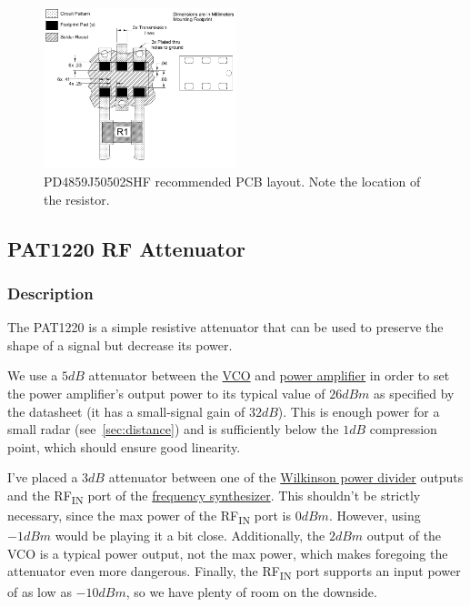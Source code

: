 \begin{figure}[h]
        \centering
        \includegraphics[width=0.5\textwidth]{data/pd4859j50502shf-pcb}
        \caption{PD4859J50502SHF recommended PCB layout. Note the location of the resistor.}
        \label{fig:pd4859j50502shf-pcb}
\end{figure}

\subsection{PAT1220 RF Attenuator}
\label{sec:pat1220}

\subsubsection{Description}
\label{sec:pat1220-description}

The PAT1220 is a simple resistive attenuator that can be used to preserve the shape of a signal but
decrease its power.

We use a $5 \si{dB}$ attenuator between the \hyperref[sec:hmc431lp4rf]{VCO} and
\hyperref[sec:se2567l]{power amplifier} in order to set the power amplifier's output power to its
typical value of $26 \si{dBm}$ as specified by the datasheet (it has a small-signal gain of
$32 \si{dB}$). This is enough power for a small radar (see~\cref{sec:distance}) and is sufficiently
below the $1 \si{dB}$ compression point, which should ensure good linearity.

I've placed a $3 \si{dB}$ attenuator between one of the \hyperref[sec:pd4859j5050s2hf]{Wilkinson
  power divider} outputs and the RF\textsubscript{IN} port of the \hyperref[sec:adf4158]{frequency
  synthesizer}. This shouldn't be strictly necessary, since the max power of the
RF\textsubscript{IN} port is $0 \si{dBm}$. However, using $-1 \si{dBm}$ would be playing it a bit
close. Additionally, the $2 \si{dBm}$ output of the VCO is a typical power output, not the max
power, which makes foregoing the attenuator even more dangerous. Finally, the RF\textsubscript{IN}
port supports an input power of as low as $-10 \si{dBm}$, so we have plenty of room on the downside.

